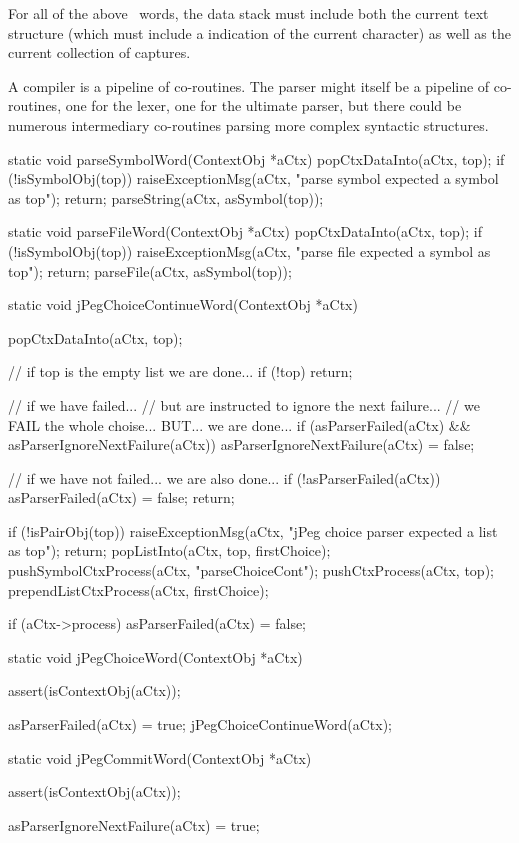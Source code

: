 For all of the above \joylol\ words, the data stack must include both the 
current text structure (which must include a indication of the current 
character) as well as the current collection of captures. 

A compiler is a pipeline of co-routines. The parser might itself be a 
pipeline of co-routines, one for the lexer, one for the ultimate parser, 
but there could be numerous intermediary co-routines parsing more complex 
syntactic structures. 

\startCCode
static void parseSymbolWord(ContextObj *aCtx) {
  popCtxDataInto(aCtx, top);
  if (!isSymbolObj(top)) {
    raiseExceptionMsg(aCtx,
      "parse symbol expected a symbol as top");
    return;
  }
  parseString(aCtx, asSymbol(top));
}

static void parseFileWord(ContextObj *aCtx) {
  popCtxDataInto(aCtx, top);
  if (!isSymbolObj(top)) {
    raiseExceptionMsg(aCtx,
      "parse file expected a symbol as top");
    return;
  }
  parseFile(aCtx, asSymbol(top));
}

static void jPegChoiceContinueWord(ContextObj *aCtx) {
  popCtxDataInto(aCtx, top);
  
  // if top is the empty list we are done...
  if (!top) return;

  // if we have failed...
  // but are instructed to ignore the next failure... 
  // we FAIL the whole choise... BUT... we are done...
  if (asParserFailed(aCtx) && asParserIgnoreNextFailure(aCtx)) {
    asParserIgnoreNextFailure(aCtx) = false;
  }
  
  // if we have not failed... we are also done...
  if (!asParserFailed(aCtx)) {
    asParserFailed(aCtx) = false;
    return;
  }
  
  if (!isPairObj(top)) {
    raiseExceptionMsg(aCtx,
      "jPeg choice parser expected a list as top");
    return;
  }
  popListInto(aCtx, top, firstChoice);
  pushSymbolCtxProcess(aCtx, "parseChoiceCont");
  pushCtxProcess(aCtx, top);
  prependListCtxProcess(aCtx, firstChoice);
  
  if (aCtx->process) {
    asParserFailed(aCtx) = false;
  }

}

static void jPegChoiceWord(ContextObj *aCtx) {
  assert(isContextObj(aCtx));
  
  asParserFailed(aCtx) = true;
  jPegChoiceContinueWord(aCtx);
}

static void jPegCommitWord(ContextObj *aCtx) {
  assert(isContextObj(aCtx));
  
  asParserIgnoreNextFailure(aCtx) = true;
}

